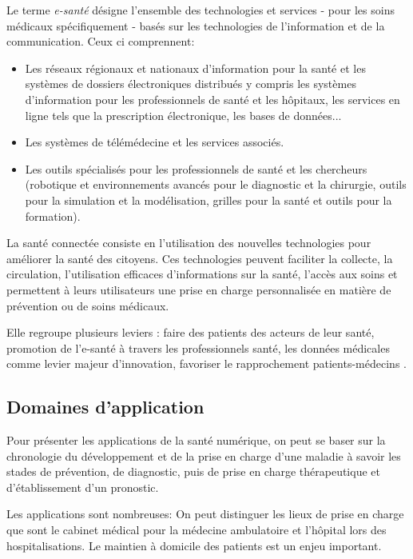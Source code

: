 \documentclass[12pt]{article}
\begin{document}
Le terme \textit{e-santé} désigne l'ensemble des technologies et services - pour les soins médicaux spécifiquement - basés sur les technologies de l'information et de la communication. 
Ceux ci comprennent:
\begin{itemize}
	\item Les réseaux régionaux et nationaux d'information pour la santé et les systèmes de dossiers électroniques distribués y compris les systèmes d'information pour les professionnels de santé et les hôpitaux, les services en ligne tels que la prescription électronique, les bases de données...
	\item Les systèmes de télémédecine et les services associés.
	\item Les outils spécialisés pour les professionnels de santé et les chercheurs (robotique et environnements avancés pour le diagnostic et la chirurgie, outils pour la simulation et la modélisation, grilles pour la santé et outils pour la formation).
\end{itemize}

La santé connectée consiste en l’utilisation des nouvelles technologies pour améliorer la santé des citoyens. Ces technologies peuvent faciliter la collecte, la circulation, l'utilisation efficaces d'informations sur la santé, l’accès aux soins et permettent à leurs utilisateurs une prise en charge personnalisée en matière de prévention ou de soins médicaux.

Elle regroupe plusieurs leviers : faire des patients des acteurs de leur santé, promotion de l’e-santé à travers les professionnels santé, les données médicales comme levier majeur d’innovation, favoriser le rapprochement patients-médecins \cite{27}.

\subsection{Domaines d’application}
Pour présenter les applications de la santé numérique, on peut se baser sur la chronologie du développement et de la prise en charge d’une maladie à savoir les stades de prévention, de diagnostic, puis de prise en charge thérapeutique et d’établissement d’un pronostic.

Les applications sont nombreuses: On peut distinguer les lieux de prise en charge que sont le cabinet médical pour la médecine ambulatoire et l’hôpital lors des hospitalisations. Le maintien à domicile des patients est un enjeu important.
\end{document}
